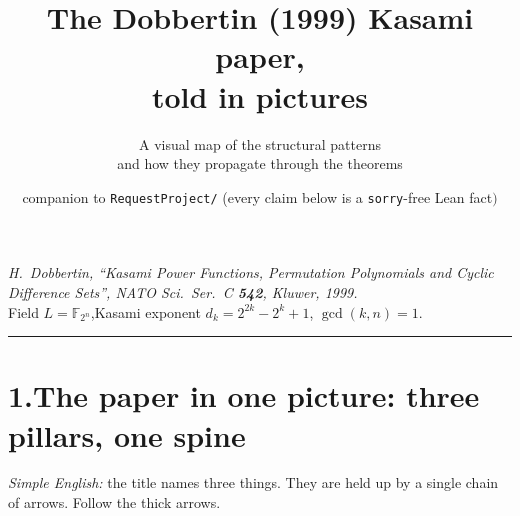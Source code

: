 \documentclass[11pt]{article}
\title{\bfseries The Dobbertin (1999) Kasami paper,\\ told in pictures}
\author{\normalsize A visual map of the structural patterns\\
\normalsize and how they propagate through the theorems}
\date{\normalsize companion to \texttt{RequestProject/} \;($\!$every claim below is a \texttt{sorry}-free Lean fact$)$}
\newcommand{\GF}{\mathbb{F}}
\newcommand{\dk}{d_k}
\begin{document}
\maketitle
\thispagestyle{empty}

\begin{center}
\footnotesize
\emph{H.\ Dobbertin, ``Kasami Power Functions, Permutation Polynomials and Cyclic
Difference Sets'', NATO Sci.\ Ser.\ C \textbf{542}, Kluwer, 1999.}\\[2pt]
Field $L=\GF_{2^n}$,\quad Kasami exponent $\dk = 2^{2k}-2^{k}+1$,\quad
$\gcd(k,n)=1$.
\end{center}

\vspace{2pt}
\hrule
\vspace{6pt}

\section*{1.\quad The paper in one picture: three pillars, one spine}
\noindent\emph{Simple English:} the title names three things. They are held up by
a single chain of arrows. Follow the thick arrows.
\end{document}
